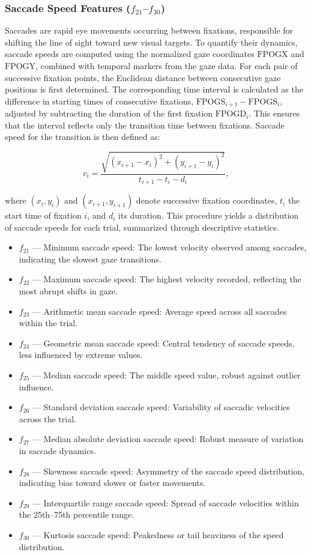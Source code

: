\documentclass[12pt]{report}
\begin{document}
\subsubsection[Saccade Speed Features (f21–f30)]{Saccade Speed Features (\(f_{21}\)–\(f_{30}\))}

Saccades are rapid eye movements occurring between fixations, responsible for shifting the line of sight toward new visual targets. 
To quantify their dynamics, saccade speeds are computed using the normalized gaze coordinates \(\mathrm{FPOGX}\) and \(\mathrm{FPOGY}\), combined with temporal markers from the gaze data. 
For each pair of successive fixation points, the Euclidean distance between consecutive gaze positions is first determined. 
The corresponding time interval is calculated as the difference in starting times of consecutive fixations, \(\mathrm{FPOGS}_{i+1} - \mathrm{FPOGS}_i\), adjusted by subtracting the duration of the first fixation \(\mathrm{FPOGD}_i\). 
This ensures that the interval reflects only the transition time between fixations. 
Saccade speed for the transition is then defined as:

\[
v_i = \frac{\sqrt{(x_{i+1} - x_i)^2 + (y_{i+1} - y_i)^2}}{t_{i+1} - t_i - d_i},
\]

where \((x_i, y_i)\) and \((x_{i+1}, y_{i+1})\) denote successive fixation coordinates, \(t_i\) the start time of fixation \(i\), and \(d_i\) its duration. 
This procedure yields a distribution of saccade speeds for each trial, summarized through descriptive statistics.

\begin{itemize}
    \item \(f_{21}\) — Minimum saccade speed: The lowest velocity observed among saccades, indicating the slowest gaze transitions.
    \item \(f_{22}\) — Maximum saccade speed: The highest velocity recorded, reflecting the most abrupt shifts in gaze.
    \item \(f_{23}\) — Arithmetic mean saccade speed: Average speed across all saccades within the trial.
    \item \(f_{24}\) — Geometric mean saccade speed: Central tendency of saccade speeds, less influenced by extreme values.
    \item \(f_{25}\) — Median saccade speed: The middle speed value, robust against outlier influence.
    \item \(f_{26}\) — Standard deviation saccade speed: Variability of saccadic velocities across the trial.
    \item \(f_{27}\) — Median absolute deviation saccade speed: Robust measure of variation in saccade dynamics.
    \item \(f_{28}\) — Skewness saccade speed: Asymmetry of the saccade speed distribution, indicating bias toward slower or faster movements.
    \item \(f_{29}\) — Interquartile range saccade speed: Spread of saccade velocities within the 25th–75th percentile range.
    \item \(f_{30}\) — Kurtosis saccade speed: Peakedness or tail heaviness of the speed distribution.
\end{itemize}
\end{document}
